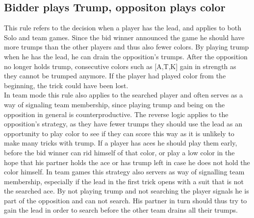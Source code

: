 \subsection{Bidder plays Trump, oppositon plays color}
This rule refers to the decision when a player has the lead, and applies to both Solo and team games.
Since the bid winner announced the game he should have more trumps than the other players and thus also fewer colors.
By playing trump when he has the lead, he can drain the opposition's trumps.
After the opposition no longer holds trump, consecutive colors such as [A,T,K] gain in strength as they cannot be
trumped anymore.
If the player had played color from the beginning, the trick could have been lost.\\
In team mode this rule also applies to the searched player and often serves as a way of signaling team membership,
since playing trump and being on the opposition in general is counterproductive.
\newline
The reverse logic applies to the opposition's strategy, as they have fewer trumps they should use the lead as an
opportunity to play color to see if they can score this way as it is unlikely to make many tricks
with trump.
If a player has aces he should play them early, before the bid winner can rid himself of that color, or play a low
color in the hope that his partner holds the ace or has trump left in case he does not hold the color himself.
\newline
In team games this strategy also servers as way of signalling team membership, especially if the lead in the first
trick opens with a suit that is not the searched ace.
By not playing trump and not searching the player signals he is part of the opposition and can not search.
His partner in turn should thus try to gain the lead in order to search before the other team drains all their trumps.
